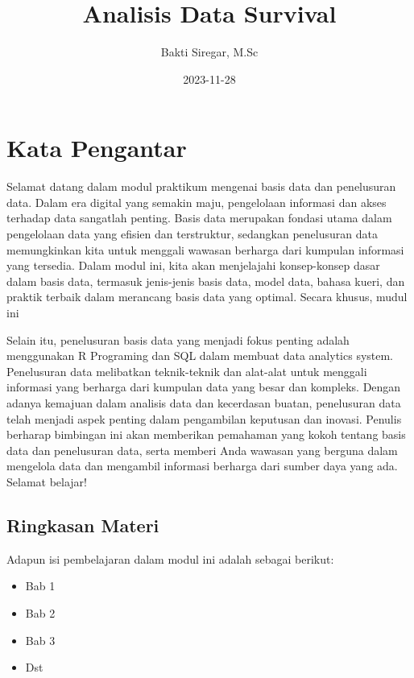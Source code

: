 \documentclass[
]{book}
\title{Analisis Data Survival}
\author{Bakti Siregar, M.Sc}
\date{2023-11-28}
\providecommand{\tightlist}{%
  \setlength{\itemsep}{0pt}\setlength{\parskip}{0pt}}
\begin{document}
\maketitle

{
\setcounter{tocdepth}{1}
\tableofcontents
}
\hypertarget{kata-pengantar}{%
\chapter*{Kata Pengantar}\label{kata-pengantar}}

Selamat datang dalam modul praktikum mengenai basis data dan penelusuran data. Dalam era digital yang semakin maju, pengelolaan informasi dan akses terhadap data sangatlah penting. Basis data merupakan fondasi utama dalam pengelolaan data yang efisien dan terstruktur, sedangkan penelusuran data memungkinkan kita untuk menggali wawasan berharga dari kumpulan informasi yang tersedia. Dalam modul ini, kita akan menjelajahi konsep-konsep dasar dalam basis data, termasuk jenis-jenis basis data, model data, bahasa kueri, dan praktik terbaik dalam merancang basis data yang optimal. Secara khusus, mudul ini

Selain itu, penelusuran basis data yang menjadi fokus penting adalah menggunakan R Programing dan SQL dalam membuat data analytics system. Penelusuran data melibatkan teknik-teknik dan alat-alat untuk menggali informasi yang berharga dari kumpulan data yang besar dan kompleks. Dengan adanya kemajuan dalam analisis data dan kecerdasan buatan, penelusuran data telah menjadi aspek penting dalam pengambilan keputusan dan inovasi. Penulis berharap bimbingan ini akan memberikan pemahaman yang kokoh tentang basis data dan penelusuran data, serta memberi Anda wawasan yang berguna dalam mengelola data dan mengambil informasi berharga dari sumber daya yang ada. Selamat belajar!

\hypertarget{ringkasan-materi}{%
\section*{Ringkasan Materi}\label{ringkasan-materi}}

Adapun isi pembelajaran dalam modul ini adalah sebagai berikut:

\begin{itemize}
\tightlist
\item
  Bab 1
\item
  Bab 2
\item
  Bab 3
\item
  Dst
\end{itemize}
\end{document}
